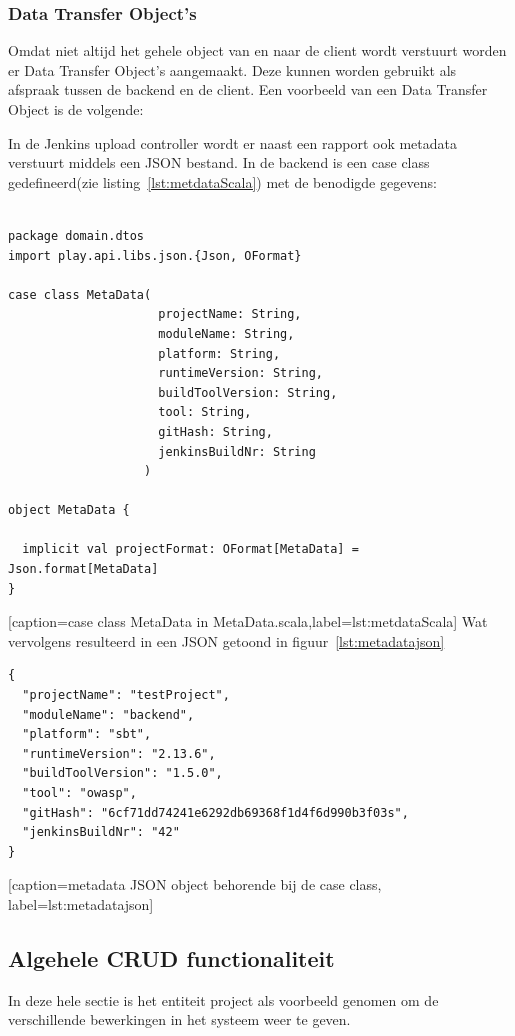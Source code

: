 
\subsubsection{Data Transfer Object's}
Omdat niet altijd het gehele object van en naar de client wordt verstuurt worden er Data Transfer Object's aangemaakt. Deze kunnen worden gebruikt als afspraak tussen de backend en de client. Een voorbeeld van een Data Transfer Object is de volgende:

In de Jenkins upload controller wordt er naast een rapport ook metadata verstuurt middels een JSON bestand. In de backend is een case class gedefineerd(zie listing~\ref{lst:metdataScala}) met de benodigde gegevens:
\begin{lstlisting}

package domain.dtos
import play.api.libs.json.{Json, OFormat}

case class MetaData(
                     projectName: String,
                     moduleName: String,
                     platform: String,
                     runtimeVersion: String,
                     buildToolVersion: String,
                     tool: String,
                     gitHash: String,
                     jenkinsBuildNr: String
                   )

object MetaData {

  implicit val projectFormat: OFormat[MetaData] = Json.format[MetaData]
}

\end{lstlisting}[caption={case class MetaData in MetaData.scala},label=lst:metdataScala]
\newpage
Wat vervolgens resulteerd in een JSON getoond in figuur~\ref{lst:metadatajson}
\begin{lstlisting}
{
  "projectName": "testProject",
  "moduleName": "backend",
  "platform": "sbt",
  "runtimeVersion": "2.13.6",
  "buildToolVersion": "1.5.0",
  "tool": "owasp",
  "gitHash": "6cf71dd74241e6292db69368f1d4f6d990b3f03s",
  "jenkinsBuildNr": "42"
}
\end{lstlisting}[caption={metadata JSON object behorende bij de case class}, label={lst:metadatajson}]
\subsection{Algehele CRUD functionaliteit}\label{subsec:algehele-crud-functionaliteit}
In deze hele sectie is het entiteit project als voorbeeld genomen om de verschillende bewerkingen in het systeem weer te geven.
